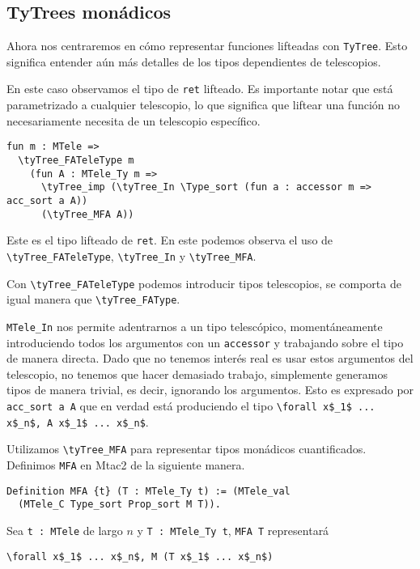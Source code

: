\subsection{TyTrees monádicos}

Ahora nos centraremos en cómo representar funciones lifteadas con \lstinline{TyTree}.
Esto significa entender aún más detalles de los tipos dependientes de telescopios.

En este caso observamos el tipo de \lstinline{ret} lifteado.
Es importante notar que está parametrizado a cualquier telescopio, lo que significa que liftear una función no necesariamente necesita de un telescopio específico.

\begin{lstlisting}
fun m : MTele =>
  \tyTree_FATeleType m
    (fun A : MTele_Ty m =>
      \tyTree_imp (\tyTree_In \Type_sort (fun a : accessor m => acc_sort a A))
      (\tyTree_MFA A))
\end{lstlisting}

Este es el tipo lifteado de \lstinline{ret}.
En este podemos observa el uso de \lstinline{\tyTree_FATeleType}, \lstinline{\tyTree_In} y \lstinline{\tyTree_MFA}.

Con \lstinline{\tyTree_FATeleType} podemos introducir tipos telescopios, se comporta de igual manera que \lstinline{\tyTree_FAType}.

\lstinline{MTele_In} nos permite adentrarnos a un tipo telescópico, momentáneamente introduciendo todos los argumentos con un \lstinline{accessor} y trabajando sobre el tipo de manera directa.
Dado que no tenemos interés real es usar estos argumentos del telescopio, no tenemos que hacer demasiado trabajo, simplemente generamos tipos de manera trivial, es decir, ignorando los argumentos. Esto es expresado por \lstinline{acc_sort a A} que en verdad está produciendo el tipo \lstinline{\forall x$_1$ ... x$_n$, A x$_1$ ... x$_n$}.

Utilizamos \lstinline{\tyTree_MFA} para representar tipos monádicos cuantificados. Definimos \lstinline{MFA} en Mtac2 de la siguiente manera.

\begin{lstlisting}
Definition MFA {t} (T : MTele_Ty t) := (MTele_val
  (MTele_C Type_sort Prop_sort M T)).
\end{lstlisting}

Sea \lstinline{t : MTele} de largo $n$ y \lstinline{T : MTele_Ty t}, \lstinline{MFA T} representará
\begin{lstlisting}
\forall x$_1$ ... x$_n$, M (T x$_1$ ... x$_n$)
\end{lstlisting}

